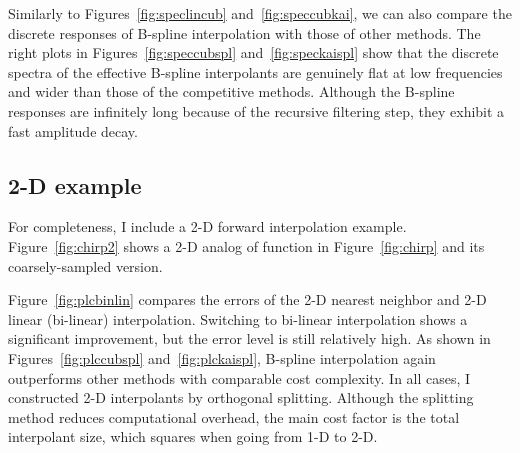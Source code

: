 
\par
Similarly to Figures~\ref{fig:speclincub} and~\ref{fig:speccubkai}, we
can also compare the discrete responses of B-spline interpolation with
those of other methods. The right plots in
Figures~\ref{fig:speccubspl} and~\ref{fig:speckaispl} show that the
discrete spectra of the effective B-spline interpolants are genuinely
flat at low frequencies and wider than those of the competitive
methods. Although the B-spline responses are infinitely long because
of the recursive filtering step, they exhibit a fast amplitude decay.



\subsection{2-D example}

For completeness, I include a 2-D forward interpolation example.
Figure~\ref{fig:chirp2} shows a 2-D analog of function in
Figure~\ref{fig:chirp} and its coarsely-sampled version.

\par
Figure~\ref{fig:plcbinlin} compares the errors of the 2-D nearest
neighbor and 2-D linear (bi-linear) interpolation. Switching to
bi-linear interpolation shows a significant improvement, but the error
level is still relatively high. As shown in
Figures~\ref{fig:plccubspl} and~\ref{fig:plckaispl}, B-spline
interpolation again outperforms other methods with comparable
cost complexity. In all cases, I constructed 2-D interpolants by orthogonal
splitting. Although the splitting method reduces computational
overhead, the main cost factor is the total interpolant size, which
squares when going from 1-D to 2-D.

